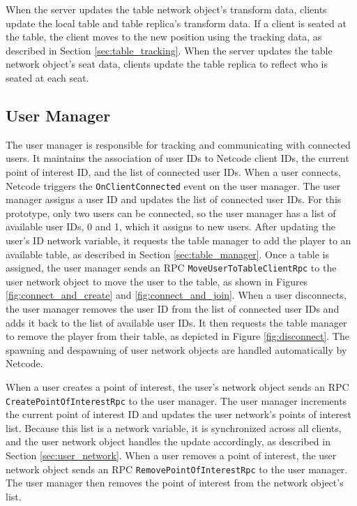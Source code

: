         When the server updates the table network object's transform data, clients update the local table and table replica's transform data. If a client is seated at the table, the client moves to the new position using the tracking data, as described in Section \ref{sec:table_tracking}. When the server updates the table network object's seat data, clients update the table replica to reflect who is seated at each seat.

    \subsection{User Manager} \label{sec:user_manager}
    
        The user manager is responsible for tracking and communicating with connected users. It maintains the association of user IDs to Netcode client IDs, the current point of interest ID, and the list of connected user IDs. When a user connects, Netcode triggers the \lstinline{OnClientConnected} event on the user manager. The user manager assigns a user ID and updates the list of connected user IDs. For this prototype, only two users can be connected, so the user manager has a list of available user IDs, 0 and 1, which it assigns to new users. After updating the user's ID network variable, it requests the table manager to add the player to an available table, as described in Section \ref{sec:table_manager}. Once a table is assigned, the user manager sends an RPC \lstinline{MoveUserToTableClientRpc} to the user network object to move the user to the table, as shown in Figures \ref{fig:connect_and_create} and \ref{fig:connect_and_join}. When a user disconnects, the user manager removes the user ID from the list of connected user IDs and adds it back to the list of available user IDs. It then requests the table manager to remove the player from their table, as depicted in Figure \ref{fig:disconnect}. The spawning and despawning of user network objects are handled automatically by Netcode.

        When a user creates a point of interest, the user's network object sends an RPC \lstinline{CreatePointOfInterestRpc} to the user manager. The user manager increments the current point of interest ID and updates the user network's points of interest list. Because this list is a network variable, it is synchronized across all clients, and the user network object handles the update accordingly, as described in Section \ref{sec:user_network}. When a user removes a point of interest, the user network object sends an RPC \lstinline{RemovePointOfInterestRpc} to the user manager. The user manager then removes the point of interest from the network object's list.
        
